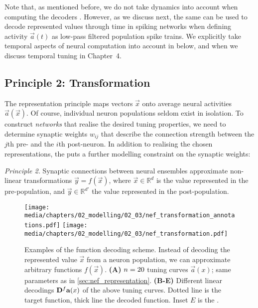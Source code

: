 Note that, as mentioned before, we do not take dynamics into account when computing the decoders \Dec.
However, as we discuss next, the same \Dec can be used to decode represented values through time in spiking networks when defining activity $\vec a(t)$ as low-pass filtered population spike trains.
We explicitly take temporal aspects of neural computation into account in  below, and when we discuss temporal tuning in Chapter~4.

\pagebreak

\subsection{Principle 2: Transformation}
\label{sec:nef_transformation}

The representation principle maps vectors $\vec x$ onto average neural activities $\vec a(\vec x)$.
Of course, individual neuron populations seldom exist in isolation.
To construct \emph{networks} that realise the desired tuning properties, we need to determine synaptic weights $w_{ij}$ that describe the connection strength between the $j$th pre- and the $i$th post-neuron.
In addition to realising the chosen representations, the \NEF puts a further modelling constraint on the synaptic weights:
\begin{framed}
\noindent\emph{\NEF Principle 2.} Synaptic connections between neural ensembles approximate non-linear transformations $\vec y = f(\vec x)$, where $\vec x \in \mathbb{R}^d$ is the value represented in the pre-population, and $\vec y \in \mathbb{R}^{d'}$ the value represented in the post-population.
\end{framed}

\begin{figure}
	\centering
	\texttt{[image: media/chapters/02\_modelling/02\_03/nef\_transformation\_annotations.pdf]}%
	\kern-157.19mm\texttt{[image: media/chapters/02\_modelling/02\_03/nef\_transformation.pdf]}
	\caption[Examples of the function decoding scheme.]{Examples of the function decoding scheme. Instead of decoding the represented value $\vec x$ from a neuron population, we can approximate arbitrary functions $f(\vec x)$.
	\textbf{(A)} $n = 20$ tuning curves $\vec a(x)$; same parameters as in \cref{sec:nef_representation}. \textbf{(B-E)} Different linear decodings $\mathbf{D}^f \mathbf{a}(x)$ of the above tuning curves. Dotted line is the target function, thick line the decoded function. Inset $E$ is the \RMSE.
	}
	\label{fig:nef_transformation}
\end{figure}

